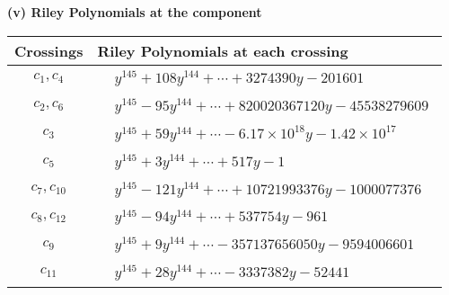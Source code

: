 \documentclass[1p]{elsarticle_modified}
\theoremstyle{definition}
\begin{document}
\newpage\renewcommand{\arraystretch}{1}
\flushleft \textbf{(v) Riley Polynomials at the component}\newline \\
\begin{tabular}{m{50pt}|m{274pt}}
Crossings & \hspace{64pt}Riley Polynomials at each crossing \\
\hline $$\begin{aligned}c_{1},c_{4}\end{aligned}$$&$\begin{aligned}
&y^{145}+108 y^{144}+\cdots+3274390 y-201601
\end{aligned}$\\
\hline $$\begin{aligned}c_{2},c_{6}\end{aligned}$$&$\begin{aligned}
&y^{145}-95 y^{144}+\cdots+820020367120 y-45538279609
\end{aligned}$\\
\hline $$\begin{aligned}c_{3}\end{aligned}$$&$\begin{aligned}
&y^{145}+59 y^{144}+\cdots-6.17\times10^{18} y-1.42\times10^{17}
\end{aligned}$\\
\hline $$\begin{aligned}c_{5}\end{aligned}$$&$\begin{aligned}
&y^{145}+3 y^{144}+\cdots+517 y-1
\end{aligned}$\\
\hline $$\begin{aligned}c_{7},c_{10}\end{aligned}$$&$\begin{aligned}
&y^{145}-121 y^{144}+\cdots+10721993376 y-1000077376
\end{aligned}$\\
\hline $$\begin{aligned}c_{8},c_{12}\end{aligned}$$&$\begin{aligned}
&y^{145}-94 y^{144}+\cdots+537754 y-961
\end{aligned}$\\
\hline $$\begin{aligned}c_{9}\end{aligned}$$&$\begin{aligned}
&y^{145}+9 y^{144}+\cdots-357137656050 y-9594006601
\end{aligned}$\\
\hline $$\begin{aligned}c_{11}\end{aligned}$$&$\begin{aligned}
&y^{145}+28 y^{144}+\cdots-3337382 y-52441
\end{aligned}$\\
\hline
\end{tabular}\\~\\
\end{document}

